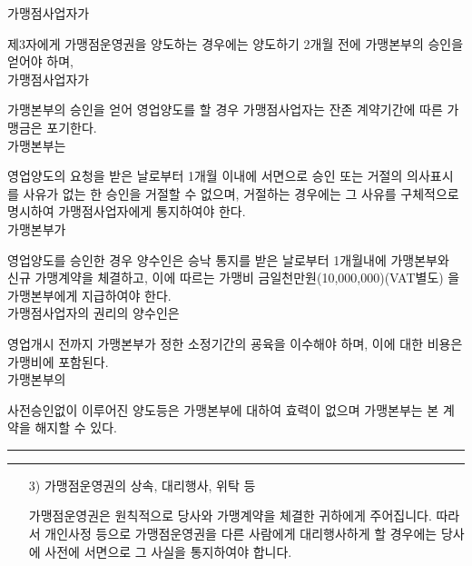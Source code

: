 \documentclass[a5paper,10pt]{oblivoir}
\newcommand\crule[3][black]{\textcolor{#1}{\rule{#2}{#3}}}
\begin{document}
\begin{enumerate}
\begin{enumerate}
\begin{tiny}
\begin{Form}
 가맹점사업자가

\noindent\dotfill 

제3자에게 가맹점운영권을 양도하는 경우에는 양도하기 2개월 전에 가맹본부의 승인을 얻어야 하며,
\\

 가맹점사업자가

\noindent\dotfill 

 가맹본부의 승인을 얻어 영업양도를 할 경우 가맹점사업자는 잔존 계약기간에 따른 가맹금은 포기한다.
\\

 가맹본부는

\noindent\dotfill 

 영업양도의 요청을 받은 날로부터 1개월 이내에 서면으로 승인 또는 거절의 의사표시를 사유가 없는 한 승인을 거절할 수 없으며, 거절하는 경우에는 그 사유를 구체적으로 명시하여 가맹점사업자에게 통지하여야 한다.
\\

가맹본부가

\noindent\dotfill 

영업양도를 승인한 경우 양수인은 승낙 통지를 받은 날로부터 1개월내에 가맹본부와 신규 가맹계약을 체결하고, 이에 따르는 가맹비 금일천만원(10,000,000)(VAT별도) 을 가맹본부에게 지급하여야 한다.
\\

 가맹점사업자의 권리의 양수인은

\noindent\dotfill 

 영업개시 전까지 가맹본부가 정한 소정기간의 굥육을 이수해야 하며, 이에 대한 비용은 가맹비에 포함된다.
\\

 가맹본부의

\noindent\dotfill 

 사전승인없이 이루어진  양도등은 가맹본부에 대하여 효력이 없으며 가맹본부는 본 계약을 해지할 수 있다.
\\


\end{Form}
\end{tiny}
\end{enumerate}
\newpage
\begin{center}
\crule[red]{4cm}{0.1cm} \crule[blue]{4cm}{0.1cm}
\end{center}
\begin{enumerate}
\item[3)] 가맹점운영권의 상속, 대리행사, 위탁 등

가맹점운영권은 원칙적으로 당사와 가맹계약을 체결한 귀하에게 주어집니다. 따라서 개인사정 등으로 가맹점운영권을 다른 사람에게 대리행사하게 할 경우에는 당사에 사전에 서면으로 그 사실을 통지하여야 합니다.


\end{enumerate}
\end{enumerate}
\end{document}
